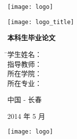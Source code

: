 
\thispagestyle{empty}

\vspace{5mm}

\begin{center}
   \texttt{[image: logo]}
\end{center}

\vspace{2mm}

\begin{center}
  \texttt{[image: logo\_title]}
\end{center}

\vspace{20mm}

\centerline{\sanhao \textbf{本科生毕业论文}}

\vspace{20mm}

\centerline{\sanhao \heiti \nstitlec}

\vspace{20mm}

\begin{tabbing}
    \hspace{30mm}
              \= \sihao 学生姓名： \= \underline{\makebox[6cm]{\sihao\nsauthornamec\hspace{2mm}\nsauthorid}} \\[2mm]
              \> \sihao 指导教师： \> \underline{\makebox[6cm]{\sihao\nsmentorc}} \\[2mm]
              \> \sihao 所在学院： \> \underline{\makebox[6cm]{\sihao\nscollegec}} \\[2mm]
              \> \sihao 所在专业： \> \underline{\makebox[6cm]{\sihao\nsmajorn\hspace{2mm}\nsgrade}} \\[2mm]
\end{tabbing}

\vspace{20mm}

\centerline{中国 - 长春}
\centerline{
    2014 年 5 月
}

\newpage

\thispagestyle{empty}

\vspace{5mm}

\begin{center}
   \texttt{[image: logo]}
\end{center}

